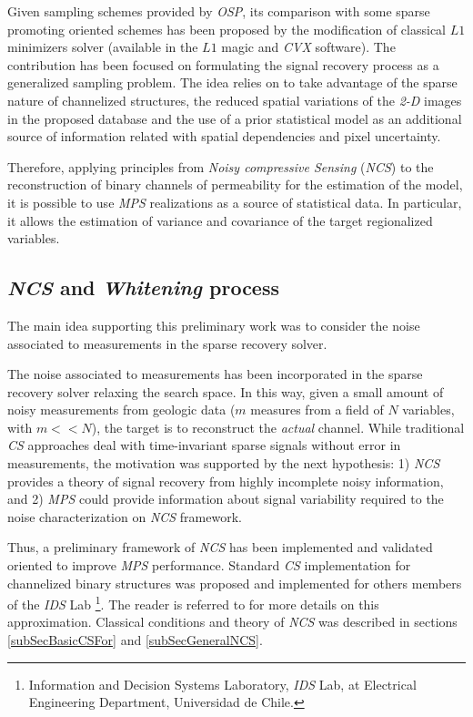 Given sampling schemes provided by \emph{OSP}, its comparison with some sparse promoting oriented schemes has been proposed by the modification of classical $L1$ minimizers solver (available in the $L1$ magic and \emph{CVX} software). The contribution has been focused on formulating the signal recovery process as a generalized sampling problem. The idea relies on to take advantage of the sparse nature of channelized structures, the reduced spatial variations of the \emph{2-D} images in the proposed database and the use of a prior statistical model as an additional source of information related with spatial dependencies and pixel uncertainty.  

Therefore, applying principles from \emph{Noisy compressive Sensing} (\emph{NCS}) to the reconstruction of binary channels of permeability for the estimation of the model, it is possible to use \emph{MPS} realizations as a source of statistical data. In particular, it allows the estimation of variance and covariance of the target regionalized variables.

\subsection{\emph{NCS} and \textit{Whitening} process}

The main idea supporting this preliminary work was to consider the noise associated to measurements in the sparse recovery solver. 

The noise associated to measurements has been incorporated in the sparse recovery solver relaxing the search space. In this way, given a small amount of noisy measurements from geologic data ($m$ measures from a field of $N$ variables, with $m << N$), the target is to reconstruct the \emph{actual} channel. While traditional \emph{CS} approaches deal with time-invariant sparse signals without error in measurements, the motivation was supported by the next hypothesis: 1) \emph{NCS} provides a theory of signal recovery from highly incomplete noisy information, and 2) \emph{MPS} could provide information about signal variability required to the noise characterization on \emph{NCS} framework.

Thus, a preliminary framework of \emph{NCS} has been  implemented and validated oriented to improve \emph{MPS} performance. Standard \emph{CS} implementation for channelized binary structures was proposed and implemented for others members of the \emph{IDS} Lab \footnote{Information and Decision Systems Laboratory, \emph{IDS} Lab, at Electrical Engineering Department, Universidad de Chile.}. The reader is referred to \cite{Calderon2015_a} for more details on this approximation. Classical conditions and theory of \emph{NCS} was described in sections \ref{subSecBasicCSFor} and \ref{subSecGeneralNCS}.

